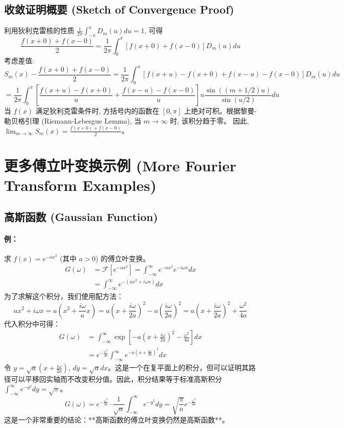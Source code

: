 \documentclass{article}
\begin{document}
	\subsection{收敛证明概要 (Sketch of Convergence Proof)}
	利用狄利克雷核的性质 $\frac{1}{2\pi} \int_{-\pi}^{\pi} D_m(u) du = 1$, 可得
	$$ 
	\frac{f(x+0) + f(x-0)}{2} = \frac{1}{2\pi} \int_0^{\pi} [f(x+0) + f(x-0)] D_m(u) du 
	$$
	考虑差值:
	$$ 
	S_m(x) - \frac{f(x+0) + f(x-0)}{2} = \frac{1}{2\pi} \int_0^{\pi} [f(x+u) - f(x+0) + f(x-u) - f(x-0)] D_m(u) du 
	$$
	$$ 
	= \frac{1}{2\pi} \int_0^{\pi} \left[ \frac{f(x+u) - f(x+0)}{u} + \frac{f(x-u) - f(x-0)}{u} \right] u \frac{\sin((m+1/2)u)}{\sin(u/2)} du 
	$$
	当 $f(x)$ 满足狄利克雷条件时, 方括号内的函数在 $[0, \pi]$ 上绝对可积。根据黎曼-勒贝格引理 (Riemann-Lebesgue Lemma), 当 $m \to \infty$ 时, 该积分趋于零。
	因此, $\lim_{m\to\infty} S_m(x) = \frac{f(x+0) + f(x-0)}{2}$。
	
	\section{更多傅立叶变换示例 (More Fourier Transform Examples)}
	
	\subsection{高斯函数 (Gaussian Function)}
	\paragraph{例：} 求 $f(x) = e^{-ax^2}$ (其中 $a>0$) 的傅立叶变换。
	\begin{align*}
		G(\omega) &= \mathcal{F}[e^{-ax^2}] = \int_{-\infty}^{\infty} e^{-ax^2} e^{-i\omega x} dx \\
		&= \int_{-\infty}^{\infty} e^{-(ax^2 + i\omega x)} dx
	\end{align*}
	为了求解这个积分，我们使用配方法：
	$$ 
	ax^2 + i\omega x = a\left(x^2 + \frac{i\omega}{a}x\right) = a\left(x + \frac{i\omega}{2a}\right)^2 - a\left(\frac{i\omega}{2a}\right)^2 = a\left(x + \frac{i\omega}{2a}\right)^2 + \frac{\omega^2}{4a} 
	$$
	代入积分中可得：
	\begin{align*}
		G(\omega) &= \int_{-\infty}^{\infty} \exp\left[-a\left(x + \frac{i\omega}{2a}\right)^2 - \frac{\omega^2}{4a}\right] dx \\
		&= e^{-\frac{\omega^2}{4a}} \int_{-\infty}^{\infty} e^{-a\left(x + \frac{i\omega}{2a}\right)^2} dx
	\end{align*}
	令 $y = \sqrt{a}(x + \frac{i\omega}{2a})$, $dy = \sqrt{a}dx$。这是一个在复平面上的积分，但可以证明其路径可以平移回实轴而不改变积分值。因此，积分结果等于标准高斯积分 $\int_{-\infty}^\infty e^{-y^2} dy = \sqrt{\pi}$。
	$$ 
	G(\omega) = e^{-\frac{\omega^2}{4a}} \cdot \frac{1}{\sqrt{a}} \int_{-\infty}^{\infty} e^{-y^2} dy = \sqrt{\frac{\pi}{a}} e^{-\frac{\omega^2}{4a}} 
	$$
	这是一个非常重要的结论：**高斯函数的傅立叶变换仍然是高斯函数**。
	
\end{document}
